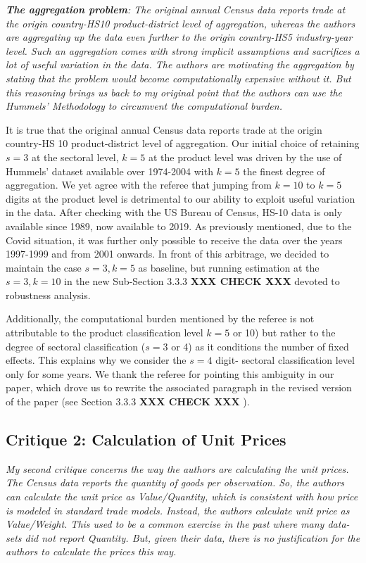 \documentclass[a4paper,11pt]{article}
\begin{document}
\textit{\textbf{The aggregation problem}: The original annual Census data reports
trade at the origin country-HS10 product-district level of aggregation,
whereas the authors are aggregating up the data even further to the origin
country-HS5 industry-year level. Such an aggregation comes with strong implicit assumptions and sacrifices a lot of useful variation in the data.
The authors are motivating the aggregation by stating that the problem
would become computationally expensive without it. But this reasoning
brings us back to my original point that the authors can use the Hummels'
Methodology to circumvent the computational burden.}

It is true that the original annual Census data reports trade at the origin country-HS 10 product-district level of aggregation. Our initial choice of retaining $s=3$ at the sectoral level, $k=5$ at the product level was driven by the use of Hummels' dataset available over 1974-2004 with $k=5$ the finest degree of aggregation. We yet agree with the referee that jumping from $k=10$ to $k=5$ digits at the product level is detrimental to our ability to exploit useful variation in the data. After checking with the US Bureau of Census, HS-10 data is only available since 1989, now available to 2019. As previously mentioned, due to the Covid situation, it was further only possible to receive the data over the years 1997-1999 and from 2001 onwards. In front of this arbitrage, we decided to maintain the case $s=3, k=5$ as baseline, but running estimation at the $s=3,k=10$ in the new Sub-Section 3.3.3 \textbf{XXX CHECK XXX }devoted to robustness analysis.

Additionally, the computational burden mentioned by the referee is not attributable to the product classification level $k=5$ or 10) but rather to the degree of sectoral classification ($s=3$ or 4) as it conditions the number of fixed effects. This explains why we consider the $s=4$ digit- sectoral classification level only for some years. We thank the referee for pointing this ambiguity in our paper, which drove us to rewrite the associated paragraph in the revised version of the paper (see Section 3.3.3 \textbf{XXX CHECK XXX }).


\subsection{Critique 2: Calculation of Unit Prices}

\textit{My second critique concerns the way the authors are calculating the unit prices.
The Census data reports the quantity of goods per observation. So, the authors
can calculate the unit price as Value/Quantity, which is consistent with how
price is modeled in standard trade models. Instead, the authors calculate unit
price as Value/Weight. This used to be a common exercise in the past where
many data-sets did not report Quantity. But, given their data, there is no
justification for the authors to calculate the prices this way.}
\end{document}
